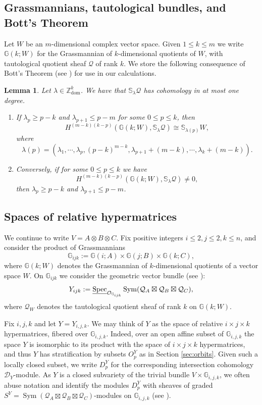 \documentclass[11pt,reqno]{amsart}
\newcommand{\D}{\mathcal{D}}
\newcommand{\oo}{\otimes}
\newcommand{\tn}{\textnormal}
\newcommand{\Sym}{\operatorname{Sym}}
\newcommand{\dom}{\operatorname{dom}}
\newcommand{\bb}[1]{\mathbb{#1}}
\newcommand{\mc}[1]{\mathcal{#1}}
\newtheorem{lemma}[theorem]{Lemma}
\numberwithin{equation}{section}
\begin{document}
\subsection{Grassmannians, tautological bundles, and Bott's Theorem} Let $W$ be an $m$-dimensional complex vector space. Given $1\leq k\leq m$ we write $\mathbb{G}(k;W)$ for the Grassmannian of $k$-dimensional quotients of $W$, with tautological quotient sheaf $\mc{Q}$ of rank $k$. We store the following consequence of Bott's Theorem (see \cite[Corollary 4.1.9]{weyman}) for use in our calculations.

\begin{lemma}\label{BottLemma}
Let $\lambda\in \mathbb{Z}^k_{\dom}$. We have that $\mathbb{S}_{\lambda}\mathcal{Q}$ has cohomology in at most one degree.
\begin{enumerate}
\item 	If $\lambda_p\geq p-k$ and $\lambda_{p+1}\leq p-m$ for some $0\leq p\leq k$, then 
$$
H^{(m-k)(k-p)}(\mathbb{G}(k;W),\mathbb{S}_{\lambda}\mathcal{Q})\cong \mathbb{S}_{\lambda(p) }W,
$$
where 
$$
\lambda(p)=(\lambda_1,\cdots,\lambda_p, (p-k)^{m-k},\lambda_{p+1}+(m-k),\cdots, \lambda_k+(m-k)).
$$
\item Conversely, if for some $0\leq p\leq k$ we have
$$
H^{(m-k)(k-p)}(\mathbb{G}(k;W),\mathbb{S}_{\lambda}\mathcal{Q})\neq 0,
$$
then $\lambda_p\geq p-k$ and $\lambda_{p+1}\leq p-m$.
\end{enumerate} 
\end{lemma}

\subsection{Spaces of relative hypermatrices}\label{sec:relmatrices} We continue to write $V=A\oo B\oo C$. Fix positive integers $i\leq 2,j \leq 2,k \leq n$, and consider the product of Grassmannians
$$
\mathbb{G}_{ijk}:=\mathbb{G}(i;A)\times \mathbb{G}(j;B)\times \mathbb{G}(k;C),
$$
where $\mathbb{G}(k;W)$ denotes the Grassmannian of $k$-dimensional quotients of a vector space $W$. On $\mathbb{G}_{ijk}$ we consider the geometric vector bundle (see \cite[Exercise II.5.18]{hartshorne}):
$$
Y_{ijk}:=\underline{\tn{Spec}}_{\mc{O}_{\mathbb{G}_{ijk}}} \Sym(\mc{Q}_A\boxtimes \mc{Q}_B\boxtimes \mc{Q}_C),
$$
where $\mc{Q}_W$ denotes the tautological quotient sheaf of rank $k$ on $\mathbb{G}(k;W)$. 

Fix $i,j,k$ and let $Y=Y_{i,j,k}$. We may think of $Y$ as the space of relative $i\times j\times k$ hypermatrices, fibered over $\bb{G}_{i,j,k}$. Indeed, over an open affine subset of $\bb{G}_{i,j,k}$ the space $Y$ is isomorphic to its product with the space of $i\times j\times k$ hypermatrices, and thus $Y$ has stratification by subsets $O_p^{Y}$ as in Section \ref{sec:orbits}. Given such a locally closed subset, we write $D_p^Y$ for the corresponding intersection cohomology $\D_Y$-module. As $Y$ is a closed subvariety of the trivial bundle $V\times \bb{G}_{i,j,k}$, we often abuse notation and identify the modules $D_p^Y$ with sheaves of graded $S^{Y}=\Sym(\mc{Q}_A\boxtimes \mc{Q}_B\boxtimes \mc{Q}_C)$-modules on $\mathbb{G}_{i,j,k}$ (see \cite[Exercise II.5.17]{hartshorne}).
\end{document}
